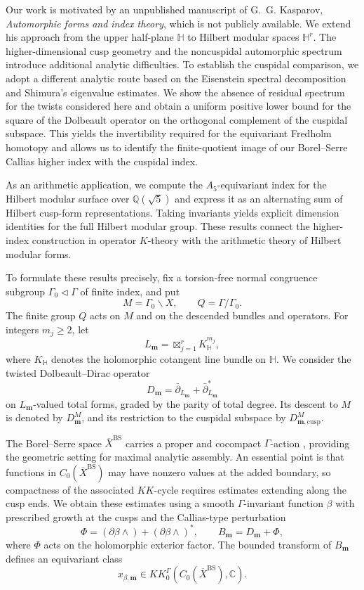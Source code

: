 \documentclass[11pt]{article}
\theoremstyle{definition}
\theoremstyle{plain}
\numberwithin{equation}{section}
\newcommand{\HH}{\mathbb H}
\newcommand{\BS}{\mathrm{BS}}
\newcommand{\cusp}{\mathrm{cusp}}
\begin{document}
Our work is motivated by an unpublished manuscript
of G.~G. Kasparov, \emph{Automorphic forms and index
theory}, which is not publicly available.
We extend his approach from the upper half-plane
$\HH$ to Hilbert modular spaces $\HH^r$.
The higher-dimensional cusp geometry and the
noncuspidal automorphic spectrum introduce additional
analytic difficulties. To establish the cuspidal
comparison, we adopt a different analytic route
based on the Eisenstein spectral decomposition
and Shimura's eigenvalue estimates. We show the
absence of residual spectrum for
the twists considered here and obtain a uniform
positive lower bound for the square of the Dolbeault
operator on the orthogonal complement of the cuspidal
subspace. This yields the invertibility required
for the equivariant Fredholm homotopy and allows us
to identify the finite-quotient image of our
Borel--Serre Callias higher index with the
cuspidal index.

As an arithmetic application, we compute the
$A_5$-equivariant index for the Hilbert modular
surface over $\mathbb Q(\sqrt5)$ and express it
as an alternating sum of Hilbert cusp-form
representations. Taking invariants yields explicit
dimension identities for the full Hilbert modular
group. These results connect the higher-index
construction in operator $K$-theory with the
arithmetic theory of Hilbert modular forms.

To formulate these results precisely, fix a torsion-free normal congruence subgroup
$\Gamma_0\triangleleft\Gamma$ of finite index, and put
\[
 M=\Gamma_0\backslash X,\qquad
 Q=\Gamma/\Gamma_0.
\]
The finite group $Q$ acts on $M$ and on the descended
bundles and operators. For integers $m_j\geq2$, let
\[
 L_{\boldsymbol m}
 =\boxtimes_{j=1}^rK_{\HH}^{m_j},
\]
where $K_{\HH}$ denotes the holomorphic cotangent line
bundle on $\HH$. We consider the twisted
Dolbeault--Dirac operator
\[
 D_{\boldsymbol m}
 =\bar\partial_{L_{\boldsymbol m}}
  +\bar\partial_{L_{\boldsymbol m}}^*
\]
on $L_{\boldsymbol m}$-valued total forms, graded
by the parity of total degree. Its descent to $M$
is denoted by $D_{\boldsymbol m}^M$, and its
restriction to the cuspidal subspace by
$D_{\boldsymbol m,\cusp}^M$.

The Borel--Serre space $\overline X^{\BS}$ carries
a proper and cocompact $\Gamma$-action
\cite{BorelSerre}, providing the geometric setting
for maximal analytic assembly. An essential point
is that functions in $C_0(\overline X^{\BS})$ may
have nonzero values at the added boundary, so
compactness of the associated $KK$-cycle requires
estimates extending along the cusp ends. We obtain
these estimates using a smooth $\Gamma$-invariant
function $\beta$ with prescribed growth at the cusps
and the Callias-type perturbation
\[
 \Phi=(\partial\beta\wedge)
       +(\partial\beta\wedge)^*,
 \qquad
 B_{\boldsymbol m}=D_{\boldsymbol m}+\Phi,
\]
where $\Phi$ acts on the holomorphic exterior factor.
The bounded transform of $B_{\boldsymbol m}$ defines
an equivariant class
\[
 x_{\beta,\boldsymbol m}
 \in KK_0^\Gamma
   (C_0(\overline X^{\BS}),\mathbb C).
\]
\end{document}
